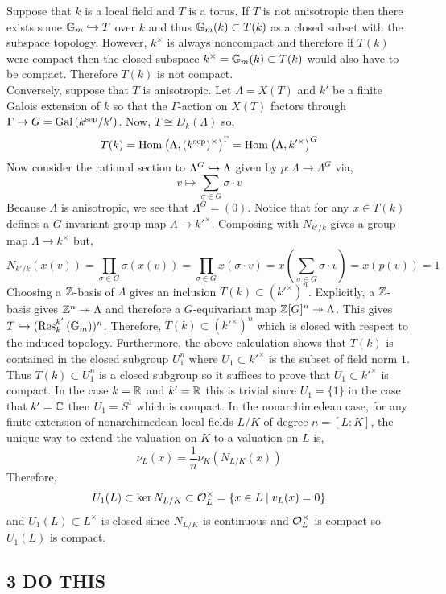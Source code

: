 \documentclass[12pt]{article}
\begin{document}
Suppose that $k$ is a local field and $T$ is a torus. If $T$ is not anisotropic then there exists some ${\mathbb{G}_m} \hookrightarrow T$ over $k$ and thus ${\mathbb{G}_m}(k) \subset T(k)$ as a closed subset with the subspace topology. However, $k^\times$ is always noncompact and therefore if $T(k)$ were compact then the closed subspace $k^\times = {\mathbb{G}_m}(k) \subset T(k)$ would also have to be compact. Therefore $T(k)$ is not compact.
\bigskip\\
Conversely, suppose that $T$ is anisotropic. Let $\Lambda = X(T)$ and $k'$ be a finite Galois extension of $k$ so that the $\Gamma$-action on $X(T)$ factors through $\Gamma \to G = \mathrm{Gal}\left( k^{\mathrm{sep}}/k' \right)$. Now, $T \cong D_k(\Lambda)$ so,
\[ T(k) = \mathrm{Hom}_{} \left( \Lambda, (k^{\mathrm{sep}})^\times \right)^\Gamma = \mathrm{Hom}_{} \left( \Lambda, k'^\times \right)^G \]
Now consider the rational section to $\Lambda^G \hookrightarrow \Lambda$ given by $p : \Lambda \to \Lambda^G$ via,
\[ v \mapsto \sum_{\sigma \in G} \sigma \cdot v \]
Because $\Lambda$ is anisotropic, we see that $\Lambda^G = (0)$. Notice that for any $x \in T(k)$ defines a $G$-invariant group map $\Lambda \to k'^\times$. Composing with $N_{k'/k}$ gives a group map $\Lambda \to k^\times$ but,
\[ N_{k'/k}(x(v)) = \prod_{\sigma \in G} \sigma(x(v)) = \prod_{\sigma \in G} x(\sigma \cdot v) = x \left( \sum_{\sigma \in G} \sigma \cdot v \right) = x(p(v)) = 1 \]
Choosing a $\mathbb{Z}$-basis of $\Lambda$ gives an inclusion $T(k) \subset (k'^\times)^n$. Explicitly, a $\mathbb{Z}$-basis gives $\mathbb{Z}^n \twoheadrightarrow \Lambda$ and therefore a $G$-equivariant map $\mathbb{Z}[G]^n \twoheadrightarrow \Lambda$. This gives $T \hookrightarrow (\mathrm{Res}^{k'}_{k} \left( {\mathbb{G}_m} \right))^n$. Therefore, $T(k) \subset (k'^\times)^n$ which is closed with respect to the induced topology. Furthermore, the above calculation shows that $T(k)$ is contained in the closed subgroup $U_1^n$ where $U_1 \subset k'^\times$ is the subset of field norm $1$. Thus $T(k) \subset U_1^n$ is a closed subgroup so it suffices to prove that $U_1 \subset k'^\times$ is compact. In the case $k = \mathbb{R}$ and $k' = \mathbb{R}$ this is trivial since $U_1 = \{ 1 \}$ in the case that $k' = \mathbb{C}$ then $U_1 = S^1$ which is compact. In the nonarchimedean case, for any finite extension of nonarchimedean local fields $L/K$ of degree $n = [L : K]$, the unique way to extend the valuation on $K$ to a valuation on $L$ is,
\[ \nu_L(x) = \frac{1}{n} \nu_K(N_{L/K}(x)) \]
Therefore, 
\[ U_1(L) \subset \ker{N_{L/K}} \subset \mathcal{O}_{L}^\times = \{ x \in L \mid v_L(x) = 0 \} \]
and $U_1(L) \subset L^\times$ is closed since $N_{L/K}$ is continuous and $\mathcal{O}_{L}^\times$ is compact so $U_1(L)$ is compact.

\subsection{3 DO THIS} 
\end{document}
